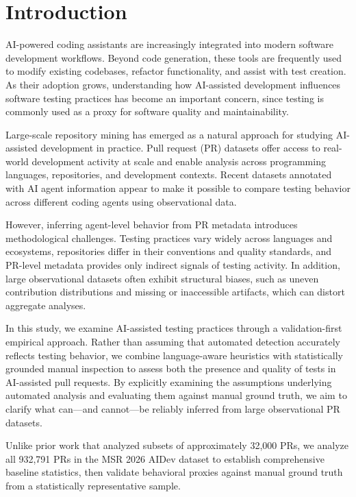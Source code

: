 \documentclass[conference]{IEEEtran}
\begin{document}
\section{Introduction}

AI-powered coding assistants are increasingly integrated into modern software development workflows. Beyond code generation, these tools are frequently used to modify existing codebases, refactor functionality, and assist with test creation. As their adoption grows, understanding how AI-assisted development influences software testing practices has become an important concern, since testing is commonly used as a proxy for software quality and maintainability.

Large-scale repository mining has emerged as a natural approach for studying AI-assisted development in practice. Pull request (PR) datasets offer access to real-world development activity at scale and enable analysis across programming languages, repositories, and development contexts. Recent datasets annotated with AI agent information appear to make it possible to compare testing behavior across different coding agents using observational data.

However, inferring agent-level behavior from PR metadata introduces methodological challenges. Testing practices vary widely across languages and ecosystems, repositories differ in their conventions and quality standards, and PR-level metadata provides only indirect signals of testing activity. In addition, large observational datasets often exhibit structural biases, such as uneven contribution distributions and missing or inaccessible artifacts, which can distort aggregate analyses.

In this study, we examine AI-assisted testing practices through a validation-first empirical approach. Rather than assuming that automated detection accurately reflects testing behavior, we combine language-aware heuristics with statistically grounded manual inspection to assess both the presence and quality of tests in AI-assisted pull requests. By explicitly examining the assumptions underlying automated analysis and evaluating them against manual ground truth, we aim to clarify what can---and cannot---be reliably inferred from large observational PR datasets.

Unlike prior work that analyzed subsets of approximately 32,000 PRs, we analyze all 932,791 PRs in the MSR 2026 AIDev dataset to establish comprehensive baseline statistics, then validate behavioral proxies against manual ground truth from a statistically representative sample.
\end{document}
